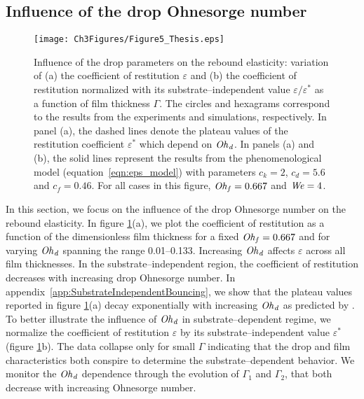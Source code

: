 \subsection{Influence of the drop Ohnesorge number}
\begin{figure}
	\centering
	\texttt{[image: Ch3Figures/Figure5\_Thesis.eps]}
	\caption{Influence of the drop parameters on the rebound elasticity: variation of (a) the coefficient of restitution $\varepsilon$ and (b) the coefficient of restitution normalized with its substrate--independent value $\varepsilon/\varepsilon^*$ as a function of film thickness $\Gamma$. The circles and hexagrams correspond to the results from the experiments and simulations, respectively. In panel (a), the dashed lines denote the plateau values of the restitution coefficient $\varepsilon^*$ which depend on $\mathit{Oh}_\mathit{d}$. In panels (a) and (b), the solid lines represent the results from the phenomenological model (equation~\eqref{eqn:eps_model}) with parameters $c_{k} = 2$, $c_{d} = 5.6$ and $c_{f} = 0.46$. For all cases in this figure, $\mathit{Oh}_\mathit{f} = 0.667$ and $\mathit{We} = 4$.}
	\label{fig:controlParameters2}
\end{figure}
In this section, we focus on the influence of the drop Ohnesorge number on the rebound elasticity.
In figure \ref{fig:controlParameters2}(a), we plot the coefficient of restitution as a function of the dimensionless film thickness for a fixed $\mathit{Oh}_\mathit{f} = 0.667$ and for varying $\mathit{Oh}_\mathit{d}$ spanning the range 0.01--0.133. Increasing $\mathit{Oh}_\mathit{d}$ affects $\varepsilon$ across all film thicknesses. In the substrate--independent region, the coefficient of restitution decreases with increasing drop Ohnesorge number. In appendix~\ref{app:SubstrateIndependentBouncing}, we show that the plateau values reported in figure \ref{fig:controlParameters2}(a) decay exponentially with increasing $\mathit{Oh}_\mathit{d}$ as predicted by \citet{jha2020viscous}. To better illustrate the influence of $\mathit{Oh}_\mathit{d}$ in substrate--dependent regime, we normalize the coefficient of restitution $\varepsilon$ by its substrate--independent value $\varepsilon^*$ (figure \ref{fig:controlParameters2}b). The data collapse only for small $\Gamma$ indicating that the drop and film characteristics both conspire to determine the substrate--dependent behavior. We monitor the $\mathit{Oh}_\mathit{d}$ dependence through the evolution of $\Gamma_1$ and $\Gamma_2$, that both decrease with increasing Ohnesorge number.

